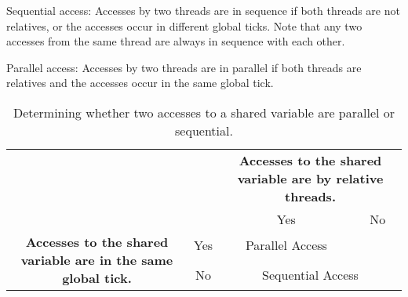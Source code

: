 \begin{definition}
	\label{def:forec_access_sequential}
	Sequential access: Accesses by two threads are in sequence if both threads are not 
	relatives, or the accesses occur in different global ticks. Note that any two accesses 
	from the same thread are always in sequence with each other.
\end{definition}

\begin{definition}
	\label{def:forec_access_parallel}
	Parallel access: Accesses by two threads are in parallel if both threads are relatives
	and the accesses occur in the same global tick.
\end{definition}

\begin{table}[t]
	\centering
	\renewcommand{\arraystretch}{1.25}		

	\begin{tabular}{c | c | c | c |}
		\multicolumn{1}{c}{}																		& \multicolumn{1}{c}{}	& \multicolumn{2}{p{5cm}}{\textbf{Accesses to the shared variable are by relative threads.}}	\\ \cline{3-4}
		\multicolumn{1}{c}{}																		& 						& Yes				& No																		\\ \cline{2-4}
		\multirow{2}{6cm}{\textbf{Accesses to the shared variable are in the same global tick.}}	& Yes					& Parallel Access	&																			\\ \cline{2-3}
																									& No					& \multicolumn{2}{c|}{Sequential Access}														\\
		\cline{2-4}
	\end{tabular}

	\caption{Determining whether two accesses to a shared variable are parallel or sequential.}
	\label{table:forec_variable_access}
\end{table}

